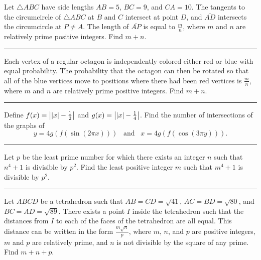 \documentclass[11pt]{scrartcl}
\begin{document}
\pagebreak

\begin{problem}
    Let $\triangle ABC$ have side lengths $AB = 5$, $BC = 9$, and $CA = 10$. The tangents to the circumcircle of $\triangle ABC$ at $B$ and $C$ intersect at point $D$, and $\overline{AD}$ intersects the circumcircle at $P \neq A$. The length of $\overline{AP}$ is equal to $\frac{m}{n}$, where $m$ and $n$ are relatively prime positive integers. Find $m + n$.
\end{problem}

\rule{\textwidth}{0.4pt}

\pagebreak

\begin{problem}
    Each vertex of a regular octagon is independently colored either red or blue with equal probability. The probability that the octagon can then be rotated so that all of the blue vertices move to positions where there had been red vertices is $\frac{m}{n}$, where $m$ and $n$ are relatively prime positive integers. Find $m + n$.
\end{problem}

\rule{\textwidth}{0.4pt}

\pagebreak

\begin{problem}
    Define $f(x) = \left\lvert \left\lvert x \right\rvert - \frac{1}{2} \right\rvert$ and $g(x) = \left\lvert \left\lvert x \right\rvert - \frac{1}{4} \right\rvert$. Find the number of intersections of the graphs of
    \[y = 4g(f(\sin(2\pi x))) \;\;\; \text{and} \;\;\; x = 4g(f(\cos(3\pi y))).\]
\end{problem}

\rule{\textwidth}{0.4pt}

\pagebreak

\begin{problem}
    Let $p$ be the least prime number for which there exists an integer $n$ such that $n^{4} + 1$ is divisible by $p^{2}$. Find the least positive integer $m$ such that $m^{4} + 1$ is divisible by $p^{2}$.
\end{problem}

\rule{\textwidth}{0.4pt}

\pagebreak

\begin{problem}
    Let $ABCD$ be a tetrahedron such that $AB = CD = \sqrt{41}$, $AC = BD = \sqrt{80}$, and $BC = AD = \sqrt{89}$. There exists a point $I$ inside the tetrahedron such that the distances from $I$ to each of the faces of the tetrahedron are all equal. This distance can be written in the form $\frac{m\sqrt{n}}{p}$, where $m$, $n$, and $p$ are positive integers, $m$ and $p$ are relatively prime, and $n$ is not divisible by the square of any prime. Find $m + n + p$.
\end{problem}
\end{document}
